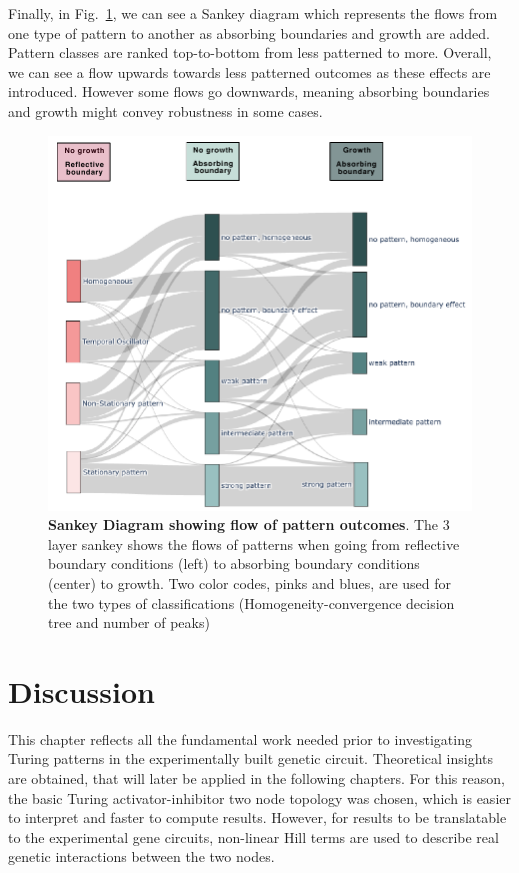 Finally, in Fig.~\ref{fig:3layer_sankey}, we can see a Sankey diagram which represents the flows from one type of pattern to another as absorbing boundaries and growth are added.
Pattern classes are ranked top-to-bottom from less patterned to more.
Overall, we can see a flow upwards towards less patterned outcomes as these effects are introduced.
However some flows go downwards, meaning absorbing boundaries and growth might convey robustness in some cases.

\begin{figure}[H] %
    \centering
    \begin{adjustbox}{center}
        \includegraphics[width=1\textwidth]{chapters/Chapter 1/3layer_sankey} %
    \end{adjustbox}
    \caption{\textbf{Sankey Diagram showing flow of pattern outcomes}. The 3 layer sankey shows the flows of patterns when going from reflective boundary conditions (left) to absorbing boundary conditions (center) to growth. Two color codes, pinks and blues, are used for the two types of classifications (Homogeneity-convergence decision tree and number of peaks)}
    \label{fig:3layer_sankey} %
\end{figure}


\section{Discussion}
This chapter reflects all the fundamental work needed prior to investigating Turing patterns in the experimentally built genetic circuit.
Theoretical insights are obtained, that will later be applied in the following chapters.
For this reason, the basic Turing activator-inhibitor two node topology was chosen, which is easier to interpret and faster to compute results.
However, for results to be translatable to the experimental gene circuits, non-linear Hill terms are used to describe real genetic interactions between the two nodes.

